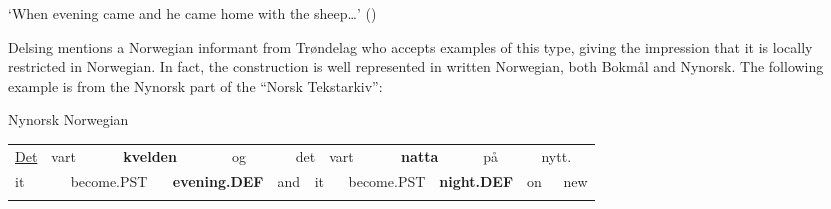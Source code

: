 \begin{styleTranslation}
‘When evening came and he came home with the sheep…’ (\citet[38]{Lundell1936})

\end{styleTranslation}

\begin{styleBodyTextFirst}
Delsing mentions a Norwegian informant from Trøndelag who accepts examples of this type, giving the impression that it is locally restricted in Norwegian. In fact, the construction is well represented in written Norwegian, both Bokmål and Nynorsk. The following example is from the Nynorsk part of the “Norsk Tekstarkiv”: 

\end{styleBodyTextFirst}

\begin{listWWNumileveli}
\item 

\begin{styleExample}
Nynorsk Norwegian

\end{styleExample}

\end{listWWNumileveli}

\begin{tabular}{llllllllllllllllll}
\lsptoprule
\hyperlink{here}{Det} & \multicolumn{2}{l}{vart

} & \multicolumn{2}{l}{{\bfseries kvelden}

} & \multicolumn{2}{l}{og

} & \multicolumn{2}{l}{det

} & \multicolumn{2}{l}{vart

} & \multicolumn{2}{l}{{\bfseries natta}

} & \multicolumn{2}{l}{på

} & \multicolumn{2}{l}{nytt.

} & \\
\multicolumn{2}{l}{it

} & \multicolumn{2}{l}{become.PST

} & \multicolumn{2}{l}{{\bfseries evening.DEF}

} & \multicolumn{2}{l}{and

} & \multicolumn{2}{l}{it

} & \multicolumn{2}{l}{become.PST

} & \multicolumn{2}{l}{{\bfseries night.DEF}

} & \multicolumn{2}{l}{on

} & \multicolumn{2}{l}{new

}\\
\lspbottomrule
\end{tabular}

